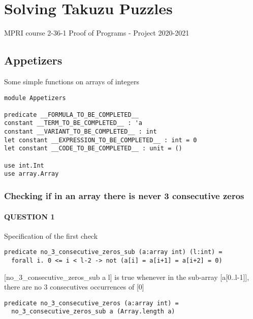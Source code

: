 \hypertarget{solving-takuzu-puzzles}{%
\section{Solving Takuzu Puzzles}\label{solving-takuzu-puzzles}}

MPRI course 2-36-1 Proof of Programs - Project 2020-2021

\hypertarget{appetizers}{%
\subsection{Appetizers}\label{appetizers}}

Some simple functions on arrays of integers

\begin{verbatim}
module Appetizers

predicate __FORMULA_TO_BE_COMPLETED__
constant __TERM_TO_BE_COMPLETED__ : 'a
constant __VARIANT_TO_BE_COMPLETED__ : int
let constant __EXPRESSION_TO_BE_COMPLETED__ : int = 0
let constant __CODE_TO_BE_COMPLETED__ : unit = ()

use int.Int
use array.Array
\end{verbatim}

\hypertarget{checking-if-in-an-array-there-is-never-3-consecutive-zeros}{%
\subsubsection{Checking if in an array there is never 3 consecutive
zeros}\label{checking-if-in-an-array-there-is-never-3-consecutive-zeros}}

\hypertarget{question-1}{%
\paragraph{QUESTION 1}\label{question-1}}

Specification of the first check

\begin{verbatim}
predicate no_3_consecutive_zeros_sub (a:array int) (l:int) =
  forall i. 0 <= i < l-2 -> not (a[i] = a[i+1] = a[i+2] = 0)
\end{verbatim}

{[}no\_3\_consecutive\_zeros\_sub a l{]} is true whenever in the
sub-array {[}a{[}0..l-1{]}{]}, there are no 3 consecutives occurrences
of {[}0{]}

\begin{verbatim}
predicate no_3_consecutive_zeros (a:array int) =
  no_3_consecutive_zeros_sub a (Array.length a)
\end{verbatim}

